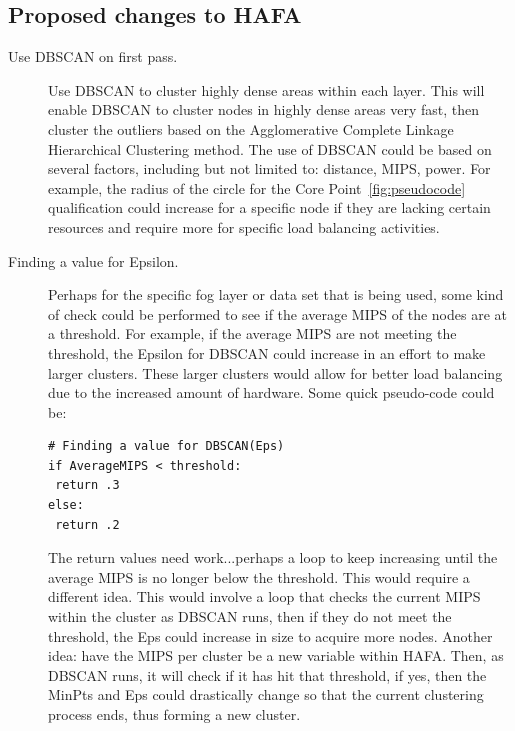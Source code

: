 \documentclass[letterpaper,twocolumn,10pt]{article}
\begin{document}
\subsection{Proposed changes to HAFA}
\begin{description}
\item[Use DBSCAN on first pass.] Use DBSCAN to cluster highly dense areas within each layer. This will enable DBSCAN to cluster nodes in highly dense areas very fast, then cluster the outliers based on the Agglomerative Complete Linkage Hierarchical Clustering method. The use of DBSCAN could be based on several factors, including but not limited to: distance, MIPS, power. For example, the radius of the circle for the Core Point~\ref{fig:pseudocode} qualification could increase for a specific node if they are lacking certain resources and require more for specific load balancing activities.

\item[Finding a value for Epsilon.] Perhaps for the specific fog layer or data set that is being used, some kind of check could be performed to see if the average MIPS of the nodes are at a threshold. For example, if the average MIPS are not meeting the threshold, the Epsilon for DBSCAN could increase in an effort to make larger clusters. These larger clusters would allow for better load balancing due to the increased amount of hardware. Some quick pseudo-code could be:
\begin{verbatim}
# Finding a value for DBSCAN(Eps)
if AverageMIPS < threshold:
 return .3
else:
 return .2
\end{verbatim}
 The return values need work...perhaps a loop to keep increasing until the average MIPS is no longer below the threshold. This would require a different idea. This would involve a loop that checks the current MIPS within the cluster as DBSCAN runs, then if they do not meet the threshold, the Eps could increase in size to acquire more nodes. Another idea: have the MIPS per cluster be a new variable within HAFA. Then, as DBSCAN runs, it will check if it has hit that threshold, if yes, then the MinPts and Eps could drastically change so that the current clustering process ends, thus forming a new cluster.
\end{description}
\end{document}
